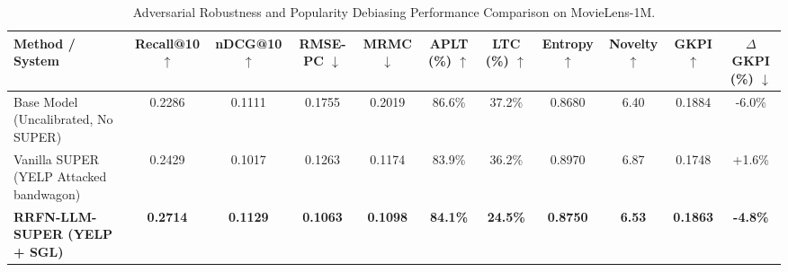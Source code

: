 \begin{table}[t]
\centering
\small
\caption{Adversarial Robustness and Popularity Debiasing Performance Comparison on MovieLens-1M.}
\label{tab:benchmark_results}
\begin{tabular}{lcccccccccc}
\toprule
\textbf{Method / System} & \textbf{Recall@10} $\uparrow$ & \textbf{nDCG@10} $\uparrow$ & \textbf{RMSE-PC} $\downarrow$ & \textbf{MRMC} $\downarrow$ & \textbf{APLT} (\%) $\uparrow$ & \textbf{LTC} (\%) $\uparrow$ & \textbf{Entropy} $\uparrow$ & \textbf{Novelty} $\uparrow$ & \textbf{GKPI} $\uparrow$ & \textbf{$\Delta$GKPI} (\%) $\downarrow$ \\
\midrule
Base Model (Uncalibrated, No SUPER) & 0.2286 & 0.1111 & 0.1755 & 0.2019 & 86.6\% & 37.2\% & 0.8680 & 6.40 & 0.1884 & -6.0\% \\
Vanilla SUPER (YELP Attacked bandwagon) & 0.2429 & 0.1017 & 0.1263 & 0.1174 & 83.9\% & 36.2\% & 0.8970 & 6.87 & 0.1748 & +1.6\% \\
\textbf{RRFN-LLM-SUPER (YELP + SGL)} & \textbf{0.2714} & \textbf{0.1129} & \textbf{0.1063} & \textbf{0.1098} & \textbf{84.1\%} & \textbf{24.5\%} & \textbf{0.8750} & \textbf{6.53} & \textbf{0.1863} & \textbf{-4.8\%} \\
\bottomrule
\end{tabular}
\end{table}